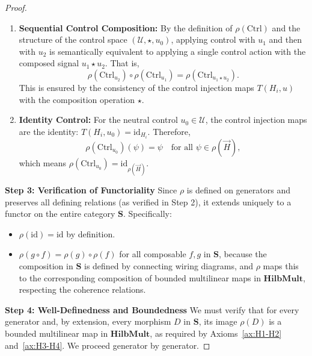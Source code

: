 \documentclass[11pt]{article}
\begin{document}
\begin{proof}
\begin{enumerate}[label=(SC\arabic*), leftmargin=*]
    \item \textbf{Sequential Control Composition:} By the definition of $\rho(\mathrm{Ctrl})$ and the structure of the control space $(\mathcal{U}, \star, u_0)$, applying control with $u_1$ and then with $u_2$ is semantically equivalent to applying a single control action with the composed signal $u_1 \star u_2$. That is,
    \[
    \rho(\mathrm{Ctrl}_{u_2}) \circ \rho(\mathrm{Ctrl}_{u_1}) = \rho(\mathrm{Ctrl}_{u_1 \star u_2}).
    \]
    This is ensured by the consistency of the control injection maps $T(H_i, u)$ with the composition operation $\star$.

    \item \textbf{Identity Control:} For the neutral control $u_0 \in \mathcal{U}$, the control injection maps are the identity: $T(H_i, u_0) = \mathrm{id}_{H_i}$. Therefore,
    \[
    \rho(\mathrm{Ctrl}_{u_0})(\psi) = \psi \quad \text{for all } \psi \in \rho(\vec{H}),
    \]
    which means $\rho(\mathrm{Ctrl}_{u_0}) = \mathrm{id}_{\rho(\vec{H})}$.
\end{enumerate}

\noindent\textbf{Step 3: Verification of Functoriality}
Since $\rho$ is defined on generators and preserves all defining relations (as verified in Step 2), it extends uniquely to a functor on the entire category $\mathbf{S}$. Specifically:
\begin{itemize}
    \item $\rho(\mathrm{id}) = \mathrm{id}$ by definition.
    \item $\rho(g \circ f) = \rho(g) \circ \rho(f)$ for all composable $f, g$ in $\mathbf{S}$, because the composition in $\mathbf{S}$ is defined by connecting wiring diagrams, and $\rho$ maps this to the corresponding composition of bounded multilinear maps in $\mathbf{HilbMult}$, respecting the coherence relations.
\end{itemize}

\noindent\textbf{Step 4: Well-Definedness and Boundedness}
We must verify that for every generator and, by extension, every morphism $D$ in $\mathbf{S}$, its image $\rho(D)$ is a  bounded multilinear map  in $\mathbf{HilbMult}$, as required by Axioms~\ref{ax:H1-H2} and~\ref{ax:H3-H4}. We proceed generator by generator.


\end{proof}
\end{document}
